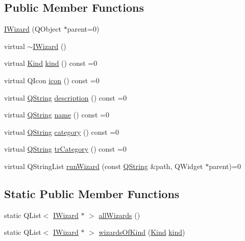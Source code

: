 \subsection*{\-Public \-Member \-Functions}
\begin{DoxyCompactItemize}
\item 
\hyperlink{group___core_plugin_ga0316d3bb75bea70865e85986aa4ed08e}{\-I\-Wizard} (\-Q\-Object $\ast$parent=0)
\item 
virtual \hyperlink{group___core_plugin_gac105c31c0637a11c0ae093f4045b920e}{$\sim$\-I\-Wizard} ()
\item 
virtual \hyperlink{group___core_plugin_ga90d21d8ad72cb14ddb8486fdff7b51f4}{\-Kind} \hyperlink{group___core_plugin_gaa6c10b903553ec4f5b93c74ebe8e76b9}{kind} () const =0
\item 
virtual \-Q\-Icon \hyperlink{group___core_plugin_gad0fdeb21587d720cb3d0d69b980610bd}{icon} () const =0
\item 
virtual \hyperlink{group___u_a_v_objects_plugin_gab9d252f49c333c94a72f97ce3105a32d}{\-Q\-String} \hyperlink{group___core_plugin_ga4f4ab96df11d7229b9c4513d38f0b09c}{description} () const =0
\item 
virtual \hyperlink{group___u_a_v_objects_plugin_gab9d252f49c333c94a72f97ce3105a32d}{\-Q\-String} \hyperlink{group___core_plugin_ga3b37cbe32b268315a5b2e8d4c061974c}{name} () const =0
\item 
virtual \hyperlink{group___u_a_v_objects_plugin_gab9d252f49c333c94a72f97ce3105a32d}{\-Q\-String} \hyperlink{group___core_plugin_ga36d083fbed01321396b7f13cabcf1e88}{category} () const =0
\item 
virtual \hyperlink{group___u_a_v_objects_plugin_gab9d252f49c333c94a72f97ce3105a32d}{\-Q\-String} \hyperlink{group___core_plugin_ga4d03cf7a4a46528d289eea825847593a}{tr\-Category} () const =0
\item 
virtual \-Q\-String\-List \hyperlink{group___core_plugin_ga40d63dbc6350512777b72c0b7a9faa38}{run\-Wizard} (const \hyperlink{group___u_a_v_objects_plugin_gab9d252f49c333c94a72f97ce3105a32d}{\-Q\-String} \&path, \-Q\-Widget $\ast$parent)=0
\end{DoxyCompactItemize}
\subsection*{\-Static \-Public \-Member \-Functions}
\begin{DoxyCompactItemize}
\item 
static \-Q\-List$<$ \hyperlink{class_core_1_1_i_wizard}{\-I\-Wizard} $\ast$ $>$ \hyperlink{group___core_plugin_ga636617c07dc09f77edce01c7da28fd63}{all\-Wizards} ()
\item 
static \-Q\-List$<$ \hyperlink{class_core_1_1_i_wizard}{\-I\-Wizard} $\ast$ $>$ \hyperlink{group___core_plugin_ga40a38812ddc1fe7b881cd2a15665455e}{wizards\-Of\-Kind} (\hyperlink{group___core_plugin_ga90d21d8ad72cb14ddb8486fdff7b51f4}{\-Kind} \hyperlink{group___core_plugin_gaa6c10b903553ec4f5b93c74ebe8e76b9}{kind})
\end{DoxyCompactItemize}


